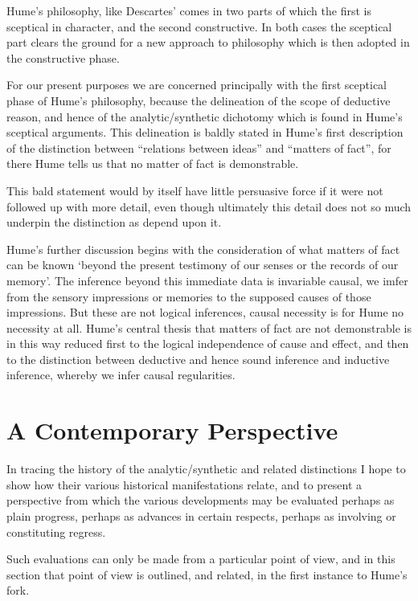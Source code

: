 Hume's philosophy, like Descartes' comes in two parts of which the
first is sceptical in character, and the second constructive.
In both cases the sceptical part clears the ground for a new approach
to philosophy which is then adopted in the constructive phase.

For our present purposes we are concerned principally with the first
sceptical phase of Hume's philosophy, because the delineation of the scope
of deductive reason, and hence of the analytic/synthetic dichotomy
which is found in Hume's sceptical arguments.
This delineation is baldly stated in Hume's first description of the
distinction between ``relations between ideas'' and ``matters of
fact'', for there Hume tells us that no matter of fact is
demonstrable.

This bald statement would by itself have little persuasive force if it
were not followed up with more detail, even though ultimately this
detail does not so much underpin the distinction as depend upon it.

Hume's further discussion begins with the consideration of what
matters of fact can be known `beyond the present testimony of 
our senses or the records of our memory'.
The inference beyond this immediate data is invariable causal, we
imfer from the sensory impressions or memories to the supposed causes
of those impressions.
But these are not logical inferences, causal necessity is for Hume no
necessity at all.
Hume's central thesis that matters of fact are not demonstrable is
in this way reduced first to the logical independence of cause and
effect, and then to the distinction between deductive and hence sound
inference and inductive inference, whereby we infer causal regularities.

\section{A Contemporary Perspective}

In tracing the history of the analytic/synthetic and related
distinctions I hope to show how their various historical
manifestations relate, and to present a perspective from which the
various developments may be evaluated perhaps as plain progress,
perhaps as advances in certain respects, perhaps as involving or
constituting regress.

Such evaluations can only be made from a particular point of view, and
in this section that point of view is outlined, and related, in the
first instance to Hume's fork.





